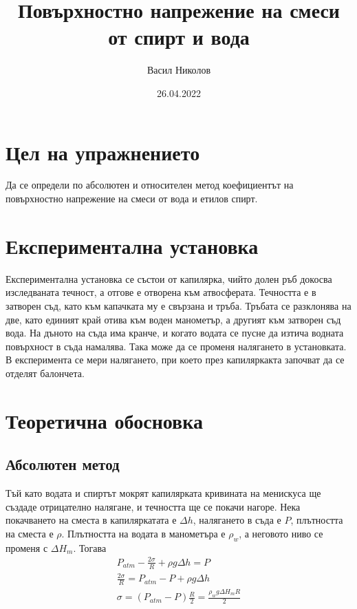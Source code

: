 \documentclass[reprint,amsmath,amssymb,aps,floatfix]{revtex4-2}
\begin{document}
\title{Повърхностно напрежение на смеси от спирт и вода}

\author{Васил Николов}
\date{26.04.2022}
\maketitle

\section{Цел на упражнението}

Да се определи по абсолютен и относителен метод коефициентът на повърхностно напрежение на смеси от вода и етилов спирт. 

\section{Експериментална установка}

Експериментална установка се състои от капилярка, чийто долен ръб докосва изследваната течност, а отгове е отворена към атвосферата. Течността е в затворен съд, като към капачката му е свързана и тръба. Тръбата се разклонява на две, като единият край отива към воден манометър, а другият към затворен съд вода. На дъното на съда има кранче, и когато водата се пусне да изтича водната повърхност в съда намалява. Така може да се променя налягането в установката. В експеримента се мери налягането, при което през капиляркакта започват да се отделят балончета. 

\section{Теоретична обосновка}
\subsection{Абсолютен метод}

Тъй като водата и спиртът мокрят капилярката кривината на менискуса ще създаде отрицателно налягане, и течността ще се покачи нагоре. Нека покачването на сместа в капиляркатата е $\Delta h$, налягането в съда е $P$, плътността на сместа е $\rho$. Плътността на водата в манометъра е $\rho_w$, а неговото ниво се променя с $\Delta H_m$. Тогава 
\begin{gather*}
    P_{atm} - \frac{2\sigma}{R} + \rho g \Delta h = P \\
    \frac{2\sigma}{R} = P_{atm} - P + \rho g \Delta h \\
    \sigma = (P_{atm} - P)\frac{R}{2} = \frac{\rho_w g \Delta H_m R}{2} \label{eq:1} \tag{1}
\end{gather*}
\end{document}
